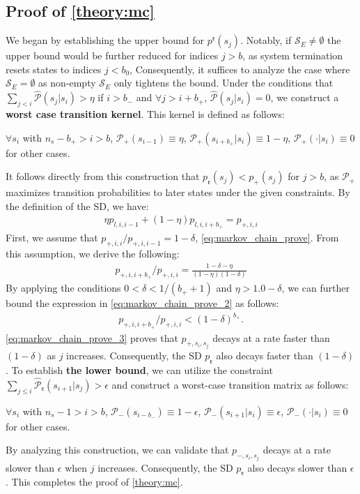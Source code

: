 \documentclass{article}
\begin{document}
\subsection{Proof of \cref{theory:mc}}
We began by establishing the upper bound for $p^\mathfrak{r}(s_j)$. Notably, if $\mathcal{S}_E \ne \emptyset$ the upper bound would be further reduced for indices $j>b$, as system termination resets states to indices $j<b_0$, Consequently, it suffices to analyze the case where $\mathcal{S}_E = \emptyset$ as non-empty $\mathcal{S}_E$ only tightens the bound.
Under the conditions that $\sum_{j<i} \hat{\mathcal{P}}(s_j|s_i) > \eta$ if $i > b_{-}$ and $\forall j > i+b_{+}$, $\hat{\mathcal{P}}(s_j|s_i) = 0$, we construct a \textbf{worst case transition kernel}. This kernel is defined as follows:
\begin{center}
$\forall s_i$ with $n_s-b_+>i>b$, $\mathcal{P}_+(s_{i-1}) \equiv \eta$, $\mathcal{P}_+(s_{i+b_{+}}|s_i) \equiv 1-\eta$, $\mathcal{P}_+(\cdot|s_i) \equiv 0$ for other cases.
\end{center}
It follows directly from this construction that $p_{\mathfrak{r}}(s_j) < p_+(s_j)$ for $j>b$, as $\mathcal{P}_+$ maximizes transition probabilities to later states under the given constraints.
By the definition of the SD, we have:
\begin{align}
    \eta p_{l,i,i-1} +(1-\eta)p_{l,i,i+b_+} = p_{+,i,i}
    \label{eq:markov_chain_prove}
\end{align}
First, we assume that $p_{+,i,i} / p_{+,i,i-1} = 1-\delta$, \cref{eq:markov_chain_prove}. From this assumption, we derive the following:
\begin{align}
    p_{+,i,i+b_+} / p_{+,i,i} =\frac{1-\delta-\eta}{(1-\eta)(1-\delta)}
    \label{eq:markov_chain_prove_2}
\end{align}
By applying the conditions $0 < \delta < 1/(b_++1)$ and $\eta > 1.0-\delta$, we can further bound the expression in \cref{eq:markov_chain_prove_2} as follows:
\begin{align}
    p_{+,i,i+b_+} / p_{+,i,i} < (1-\delta)^{b_+}.
    \label{eq:markov_chain_prove_3}
\end{align}
\cref{eq:markov_chain_prove_3} proves that $p_{+,s_i,s_j}$ decays at a rate faster than $(1-\delta)$ as $j$ increases. Consequently, the SD $p_{\mathfrak{r}}$ also decays faster than $(1-\delta)$.
To establish \textbf{the lower bound}, we can utilize the constraint $\sum_{j \le i} \hat{\mathcal{P}}_{\mathfrak{r}}(s_{i+1}|s_j) > \epsilon$ and construct a worst-case transition matrix as follows:
\begin{center}
$\forall s_i$ with $n_s-1>i>b$, $\mathcal{P}_-(s_{i-b_-}) \equiv 1-\epsilon$, $\mathcal{P}_-(s_{i+1}|s_i) \equiv \epsilon$, $\mathcal{P}_-(\cdot|s_i) \equiv 0$ for other cases.
\end{center}
By analyzing this construction, we can validate that $p_{-,s_i,s_j}$ decays at a rate slower than $\epsilon$ when $j$ increases. Consequently, the SD $p_{\mathfrak{r}}$ also decays slower than $\epsilon$. This completes the proof of \cref{theory:mc}.
\end{document}
